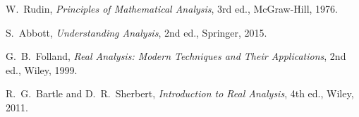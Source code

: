 \documentclass[11pt,a4paper]{article}
\theoremstyle{definition}
\theoremstyle{plain}
\theoremstyle{remark}
\begin{document}
\begin{enumerate}[label={[\arabic*]}]
    \item W.~Rudin, \emph{Principles of Mathematical Analysis}, 3rd ed.,
    McGraw-Hill, 1976.

    \item S.~Abbott, \emph{Understanding Analysis}, 2nd ed.,
    Springer, 2015.

    \item G.~B.~Folland, \emph{Real Analysis: Modern Techniques and Their
    Applications}, 2nd ed., Wiley, 1999.

    \item R.~G.~Bartle and D.~R.~Sherbert, \emph{Introduction to Real Analysis},
    4th ed., Wiley, 2011.
\end{enumerate}
\end{document}
